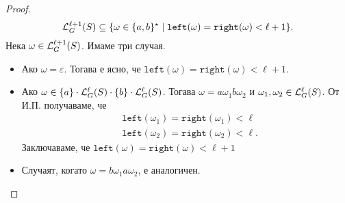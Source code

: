 \begin{proof}
  \[\mathcal{L}^{\ell+1}_G(S) \subseteq \{\omega \in \{a,b\}^\star \mid \texttt{left}(\omega) = \texttt{right}(\omega) < \ell+1 \}.\]
  Нека $\omega \in \mathcal{L}^{\ell+1}_G(S)$. Имаме три случая.
  \begin{itemize}
  \item
    Ако $\omega = \varepsilon$. Тогава е ясно, че $\texttt{left}(\omega) = \texttt{right}(\omega) < \ell+1$.
  \item
    Ако $\omega \in \{a\} \cdot \mathcal{L}^\ell_G(S) \cdot \{b\} \cdot \mathcal{L}^\ell_G(S)$.
    Тогава $\omega = a \omega_1 b \omega_2$ и $\omega_1, \omega_2 \in \mathcal{L}^\ell_G(S)$.
    От И.П. получаваме, че
    \begin{align*}
      & \texttt{left}(\omega_1) = \texttt{right}(\omega_1) < \ell\\
      & \texttt{left}(\omega_2) = \texttt{right}(\omega_2) < \ell.
    \end{align*}
    Заключаваме, че $\texttt{left}(\omega) = \texttt{right}(\omega) < \ell+1$
  \item
    Случаят, когато $\omega = b \omega_1 a \omega_2$, е аналогичен.
  \end{itemize}
\end{proof}

